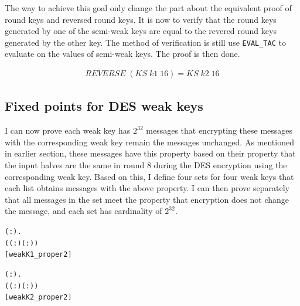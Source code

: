 \documentclass{article}
\begin{document}
The way to achieve this goal only change the part about the equivalent proof of round keys and reversed round keys.
It is now to verify that the round keys generated by one of the semi-weak keys are equal to the revered round
keys generated by the other key. The method of verification is still use \verb|EVAL_TAC| to evaluate on the values of semi-weak
keys. The proof is then done.

\begin{equation*}
\begin{split}
 REVERSE \; (KS \; k1 \; 16)= KS \; k2 \; 16
\end{split}
\end{equation*}

\subsection{Fixed points for DES weak keys}
I can now prove each weak key has $2^{32}$ messages that encrypting these messages with the corresponding weak key remain
the messages unchanged. As mentioned in earlier section, these messages have this property based on their property that
the input halves are the same in round 8 during the DES encryption using the corresponding weak key. Based on this, I define
four sets for four weak keys that each list obtains messages with the above property. I can then prove separately that
all messages in the set meet the property that encryption does not change the message, and each set has cardinality
of $2^{32}$.

\begin{alltt}
\HOLTokenTurnstile{} \HOLSymConst{\HOLTokenForall{}}( :).
      \HOLSymConst{\HOLTokenIn{}}  \HOLSymConst{\HOLTokenConj{}}
       \HOLSymConst{=}
     (( : \HOLTokenMap{} )\HOLSymConst{,}( : \HOLTokenMap{} )) \HOLSymConst{\HOLTokenImp{}}
       \HOLSymConst{=} \hfill{[weakK1_proper2]}
\end{alltt}

\begin{alltt}
\HOLTokenTurnstile{} \HOLSymConst{\HOLTokenForall{}}( :).
      \HOLSymConst{\HOLTokenIn{}}  \HOLSymConst{\HOLTokenConj{}}
       \HOLSymConst{=}
     (( : \HOLTokenMap{} )\HOLSymConst{,}( : \HOLTokenMap{} )) \HOLSymConst{\HOLTokenImp{}}
       \HOLSymConst{=} \hfill{[weakK2_proper2]}
\end{alltt}
\end{document}
